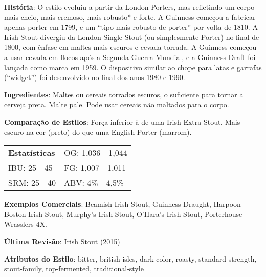 \textbf{História}: O estilo evoluiu a partir da London Porters, mas refletindo um corpo mais cheio, mais cremoso, mais robusto* e forte. A Guinness começou a fabricar apenas porter em 1799, e um “tipo mais robusto de porter” por volta de 1810. A Irish Stout divergiu da London Single Stout (ou simplesmente Porter) no final de 1800, com ênfase em maltes mais escuros e cevada torrada. A Guinness começou a usar cevada em flocos após a Segunda Guerra Mundial, e a Guinness Draft foi lançada como marca em 1959. O dispositivo similar ao chope para latas e garrafas (“widget”) foi desenvolvido no final dos anos 1980 e 1990.

\textbf{Ingredientes}: Maltes ou cereais torrados escuros, o suficiente para tornar a cerveja preta. Malte pale. Pode usar cereais não maltados para o corpo.

\textbf{Comparação de Estilos}: Força inferior à de uma Irish Extra Stout. Mais escuro na cor (preto) do que uma English Porter (marrom).

\begin{tabular}{@{}p{35mm}p{35mm}@{}}
  \textbf{Estatísticas} & OG: 1,036 - 1,044 \\
  IBU: 25 - 45  & FG: 1,007 - 1,011 \\
  SRM: 25 - 40  & ABV: 4\% - 4,5\%
\end{tabular}

\textbf{Exemplos Comerciais}: Beamish Irish Stout, Guinness Draught, Harpoon Boston Irish Stout, Murphy's Irish Stout, O'Hara's Irish Stout, Porterhouse Wrasslers 4X.

\textbf{Última Revisão}: Irish Stout (2015)

\textbf{Atributos do Estilo}: bitter, british-isles, dark-color, roasty, standard-strength, stout-family, top-fermented, traditional-style